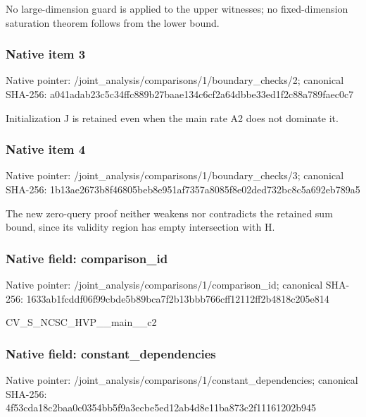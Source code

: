\documentclass[10pt,a4paper]{article}
\begin{document}
\begingroup\raggedright\sloppy No large-dimension guard is applied to the upper witnesses;\allowbreak{} no fixed-dimension saturation theorem follows from the lower bound.\par\endgroup

\subsubsection{Native item 3}
Native pointer: /joint\_\allowbreak{}analysis/comparisons/1/boundary\_\allowbreak{}checks/2; canonical SHA-256: a041adab23c5c34ffc889b27baae134c6cf2a64dbbe33ed1f2c88a789faec0c7

\begingroup\raggedright\sloppy Initialization J is retained even when the main rate A2 does not dominate it.\par\endgroup

\subsubsection{Native item 4}
Native pointer: /joint\_\allowbreak{}analysis/comparisons/1/boundary\_\allowbreak{}checks/3; canonical SHA-256: 1b13ae2673b8f46805beb8e951af7357a8085f8e02ded732bc8c5a692eb789a5

\begingroup\raggedright\sloppy The new zero-query proof neither weakens nor contradicts the retained sum bound,\allowbreak{} since its validity region has empty intersection with H.\par\endgroup

\subsubsection{Native field: comparison\_\allowbreak{}id}
Native pointer: /joint\_\allowbreak{}analysis/comparisons/1/comparison\_\allowbreak{}id; canonical SHA-256: 1633ab1fcddf06f99cbde5b89bca7f2b13bbb766cff12112ff2b4818c205e814

\begingroup\raggedright\sloppy CV\_\allowbreak{}S\_\allowbreak{}NCSC\_\allowbreak{}HVP\_\allowbreak{}\_\allowbreak{}main\_\allowbreak{}\_\allowbreak{}c2\par\endgroup

\subsubsection{Native field: constant\_\allowbreak{}dependencies}
Native pointer: /joint\_\allowbreak{}analysis/comparisons/1/constant\_\allowbreak{}dependencies; canonical SHA-256: 4f53cda18c2baa0c0354bb5f9a3ecbe5ed12ab4d8e11ba873c2f11161202b945
\end{document}
